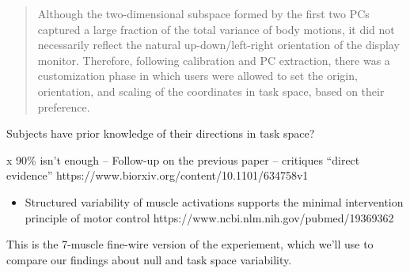 \documentclass[../main.tex]{subfiles}
\begin{document}
\begin{quote}
Although the two-dimensional subspace formed by the first two PCs captured a large fraction of the total variance of body motions, it did not necessarily reflect the natural up-down/left-right orientation of the display monitor. Therefore, following calibration and PC extraction, there was a customization phase in which users were allowed to set the origin, orientation, and scaling of the coordinates in task space, based on their preference.
\end{quote}

Subjects have prior knowledge of their directions in task space?

x 90\% isn't enough -- Follow-up on the previous paper -- critiques ``direct evidence'' https://www.biorxiv.org/content/10.1101/634758v1

\begin{itemize}
\tightlist
\item
  Structured variability of muscle activations supports the minimal intervention principle of motor control https://www.ncbi.nlm.nih.gov/pubmed/19369362
\end{itemize}

This is the 7-muscle fine-wire version of the experiement, which we'll use to compare our findings about null and task space variability.


\end{document}
